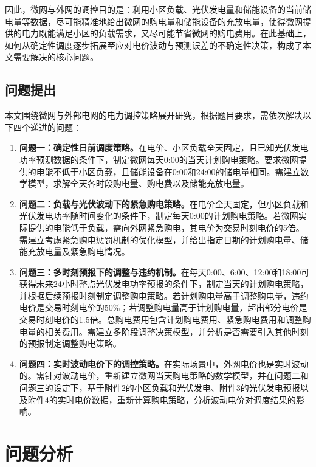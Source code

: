 \documentclass[withoutpreface,bwprint]{cumcmthesis} %
\begin{document}
因此，微网与外网的调控目的是：利用小区负载、光伏发电量和储能设备的当前储电量等数据，尽可能精准地给出微网的购电量和储能设备的充放电量，使得微网提供的电力既能满足小区的负载需求，又尽可能节省微网的购电费用。在此基础上，如何从确定性调度逐步拓展至应对电价波动与预测误差的不确定性决策，构成了本文需要解决的核心问题。%
\subsection{问题提出}
本文围绕微网与外部电网的电力调控策略展开研究，根据题目要求，需依次解决以下四个递进的问题：

\begin{enumerate}
    \item \textbf{问题一：确定性日前调度策略。}在电价、小区负载全天固定，且已知光伏发电功率预测数据的条件下，制定微网每天0:00的当天计划购电策略。要求微网提供的电能不低于小区负载，且储能设备在0:00和24:00的储电量相同。需建立数学模型，求解全天各时段购电量、购电费以及储能充放电量。
    
    \item \textbf{问题二：负载与光伏波动下的紧急购电策略。}在电价全天固定，但小区负载和光伏发电功率随时间变化的条件下，制定每天0:00的计划购电策略。若微网实际提供的电能低于负载，需向外网紧急购电，其电价为交易时刻电价的5倍。需建立考虑紧急购电惩罚机制的优化模型，并给出指定日期的计划购电量、储能充放电量及紧急购电情况。
    
    \item \textbf{问题三：多时刻预报下的调整与违约机制。}在每天0:00、6:00、12:00和18:00可获得未来24小时整点光伏发电功率预报的条件下，制定当天的计划购电策略，并根据后续预报时刻制定调整购电策略。若计划购电量高于调整购电量，违约电价是交易时刻电价的50\%；若调整购电量高于计划购电量，超出部分电价是交易时刻电价的1.5倍。总购电费用包含计划购电费用、紧急购电费用和调整购电量的相关费用。需建立多阶段调整决策模型，并分析是否需要引入其他时刻的预报制定调整购电策略。
    
    \item \textbf{问题四：实时波动电价下的调控策略。}在实际场景中，外网电价也是实时波动的。需针对波动电价，重新建立微网当天购电策略的数学模型，并在问题二和问题三的设定下，基于附件2的小区负载和光伏发电、附件3的光伏发电预报以及附件4的实时电价数据，重新计算购电策略，分析波动电价对调度结果的影响。
\end{enumerate}

\section{问题分析}
\end{document}
